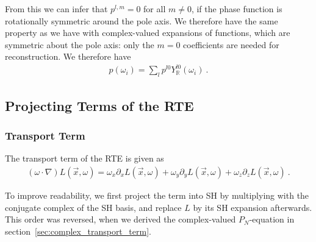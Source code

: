 \documentclass{egpubl}
\newcommand{\SHBR}{Y_{\mathbb{R}}} %
\begin{document}
From this we can infer that $p^{l,m} = 0$ for all $m\ne0$, if the phase function is rotationally symmetric around the pole axis. We therefore have the same property as we have with complex-valued expansions of functions, which are symmetric about the pole axis: only the $m=0$ coefficients are needed for reconstruction. We therefore have
\begin{align}
\label{eq:sh_exp_phase}
p(\omega_i) =
\sum_l
{
p^{l0}
\SHBR^{l0}(\omega_i)
} \ .
\end{align}



\subsection{Projecting Terms of the RTE}

\subsubsection{Transport Term}

The transport term of the RTE is given as
\begin{align}
(\omega\cdot\nabla)L(\vec{x}, \omega)
=
\omega_{x}\partial_xL\left (\vec{x} ,\omega \right )+\omega_{y}\partial_yL\left (\vec{x} ,\omega \right )+\omega_{z}\partial_zL\left (\vec{x} ,\omega \right ) \ .
\label{eq:real_transport_term}
\end{align}

To improve readability, we first project the term into SH by multiplying with the conjugate complex of the SH basis, and replace $L$ by its SH expansion afterwards. This order was reversed, when we derived the complex-valued $P_N$-equation in section~\ref{sec:complex_transport_term}.
\end{document}

